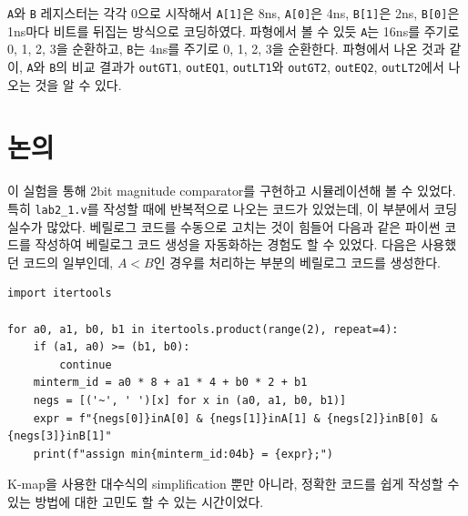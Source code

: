 \documentclass{scrartcl}
\begin{document}
\texttt{A}와 \texttt{B} 레지스터는 각각 0으로 시작해서 \texttt{A[1]}은 8ns, \texttt{A[0]}은 4ns, \texttt{B[1]}은 2ns, \texttt{B[0]}은 1ns마다 비트를 뒤집는 방식으로 코딩하였다. 파형에서 볼 수 있듯 \texttt{A}는 16ns를 주기로 0, 1, 2, 3을 순환하고, \texttt{B}는 4ns를 주기로 0, 1, 2, 3을 순환한다.
파형에서 나온 것과 같이, \texttt{A}와 \texttt{B}의 비교 결과가 \texttt{outGT1}, \texttt{outEQ1}, \texttt{outLT1}와 \texttt{outGT2}, \texttt{outEQ2}, \texttt{outLT2}에서 나오는 것을 알 수 있다.

\section{논의}
이 실험을 통해 2bit magnitude comparator를 구현하고 시뮬레이션해 볼 수 있었다. 특히 \texttt{lab2\_1.v}를 작성할 때에 반복적으로 나오는 코드가 있었는데, 이 부분에서 코딩 실수가 많았다. 베릴로그 코드를 수동으로 고치는 것이 힘들어 다음과 같은 파이썬 코드를 작성하여 베릴로그 코드 생성을 자동화하는 경험도 할 수 있었다. 다음은 사용했던 코드의 일부인데, \(A < B\)인 경우를 처리하는 부분의 베릴로그 코드를 생성한다.
\lstset{language=Python}
\begin{lstlisting}
import itertools

for a0, a1, b0, b1 in itertools.product(range(2), repeat=4):
    if (a1, a0) >= (b1, b0):
        continue
    minterm_id = a0 * 8 + a1 * 4 + b0 * 2 + b1
    negs = [('~', ' ')[x] for x in (a0, a1, b0, b1)]
    expr = f"{negs[0]}inA[0] & {negs[1]}inA[1] & {negs[2]}inB[0] & {negs[3]}inB[1]"
    print(f"assign min{minterm_id:04b} = {expr};")
\end{lstlisting}
K-map을 사용한 대수식의 simplification 뿐만 아니라, 정확한 코드를 쉽게 작성할 수 있는 방법에 대한 고민도 할 수 있는 시간이었다.
\end{document}
